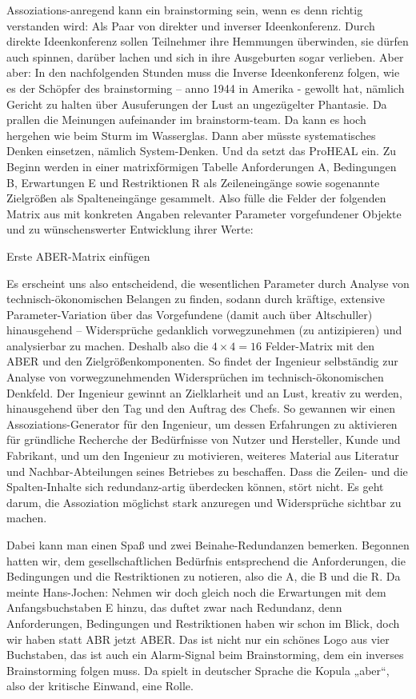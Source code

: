 \documentclass[12pt,a4paper]{article}
\begin{document}
Assoziations-anregend kann ein brainstorming sein, wenn es denn richtig
verstanden wird: Als Paar von direkter und inverser Ideenkonferenz. Durch
direkte Ideenkonferenz sollen Teilnehmer ihre Hemmungen überwinden, sie dürfen
auch spinnen, darüber lachen und sich in ihre Ausgeburten sogar verlieben. Aber
aber: In den nachfolgenden Stunden muss die Inverse Ideenkonferenz folgen, wie
es der Schöpfer des brainstorming – anno 1944 in Amerika - gewollt hat, nämlich
Gericht zu halten über Ausuferungen der Lust an ungezügelter Phantasie. Da
prallen die Meinungen aufeinander im brainstorm-team. Da kann es hoch hergehen
wie beim Sturm im Wasserglas. Dann aber müsste systematisches Denken einsetzen,
nämlich System-Denken. Und da setzt das ProHEAL ein. Zu Beginn werden in einer
matrixförmigen Tabelle Anforderungen A, Bedingungen B, Erwartungen E und
Restriktionen R als Zeileneingänge sowie sogenannte Zielgrößen als
Spalteneingänge gesammelt. Also fülle die Felder der folgenden Matrix aus mit
konkreten Angaben relevanter Parameter vorgefundener Objekte und zu
wünschenswerter Entwicklung ihrer Werte:
\begin{center}
  Erste ABER-Matrix einfügen
\end{center}

Es erscheint uns also entscheidend, die wesentlichen Parameter durch Analyse
von technisch-ökonomischen Belangen zu finden, sodann durch kräftige, extensive
Parameter-Variation über das Vorgefundene (damit auch über Altschuller)
hinausgehend – Widersprüche gedanklich vorwegzunehmen (zu antizipieren) und
analysierbar zu machen. Deshalb also die $4\times 4 = 16$ Felder-Matrix mit den
ABER und den Zielgrößenkomponenten. So findet der Ingenieur selbständig zur
Analyse von vorwegzunehmenden Widersprüchen im technisch-ökonomischen
Denkfeld. Der Ingenieur gewinnt an Zielklarheit und an Lust, kreativ zu werden,
hinausgehend über den Tag und den Auftrag des Chefs. So gewannen wir einen
Assoziations-Generator für den Ingenieur, um dessen Erfahrungen zu aktivieren
für gründliche Recherche der Bedürfnisse von Nutzer und Hersteller, Kunde und
Fabrikant, und um den Ingenieur zu motivieren, weiteres Material aus Literatur
und Nachbar-Abteilungen seines Betriebes zu beschaffen. Dass die Zeilen- und
die Spalten-Inhalte sich redundanz-artig überdecken können, stört nicht. Es
geht darum, die Assoziation möglichst stark anzuregen und Widersprüche sichtbar
zu machen.

Dabei kann man einen Spaß und zwei Beinahe-Redundanzen bemerken. Begonnen
hatten wir, dem gesellschaftlichen Bedürfnis entsprechend die Anforderungen,
die Bedingungen und die Restriktionen zu notieren, also die A, die B und die
R. Da meinte Hans-Jochen: Nehmen wir doch gleich noch die Erwartungen mit dem
Anfangsbuchstaben E hinzu, das duftet zwar nach Redundanz, denn Anforderungen,
Bedingungen und Restriktionen haben wir schon im Blick, doch wir haben statt
ABR jetzt ABER. Das ist nicht nur ein schönes Logo aus vier Buchstaben, das ist
auch ein Alarm-Signal beim Brainstorming, dem ein inverses Brainstorming folgen
muss. Da spielt in deutscher Sprache die Kopula „aber“, also der kritische
Einwand, eine Rolle.
\end{document}
